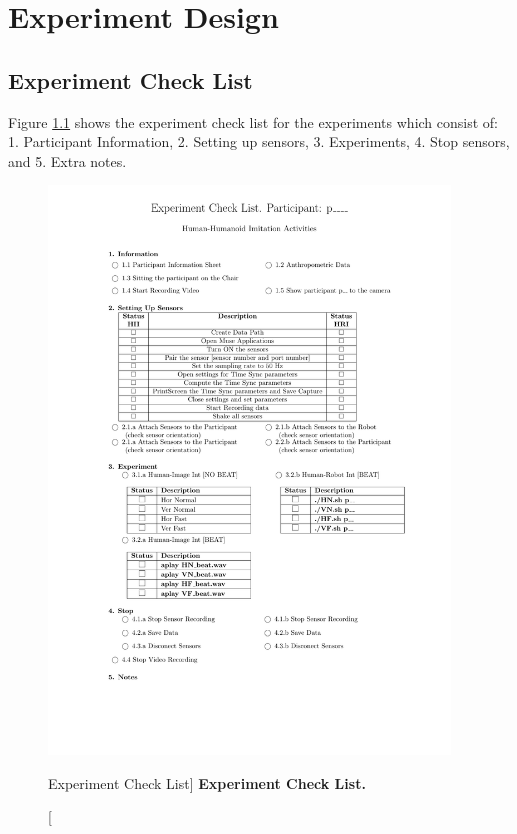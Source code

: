 \chapter{Experiment Design} \label{appendix:d}

\graphicspath{
	{appendixD/experiment_check_list/PDF/}
	{appendixD/participation_sheet/}}



\section{Experiment Check List} \label{appendix:d:ecl}
Figure \ref{fig:ecl} shows the experiment check list for the experiments 
which consist of: 1. Participant Information, 2. Setting up sensors, 
3. Experiments, 4. Stop sensors, and 5. Extra notes.
\begin{figure}
 \centering
   \includegraphics[width=0.95\textwidth]{cl}
   \caption
	[Experiment Check List]{
	{\bf Experiment Check List.}
}
   \label{fig:ecl}
\end{figure}


